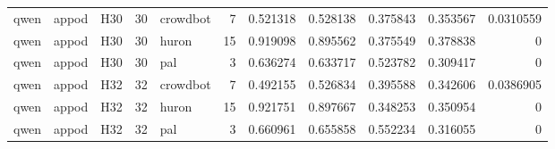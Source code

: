 \begin{longtable}{lllrlrrrrrr}
qwen & appod & H30 & 30 & crowdbot & 7 & 0.521318 & 0.528138 & 0.375843 & 0.353567 & 0.0310559 \\
qwen & appod & H30 & 30 & huron & 15 & 0.919098 & 0.895562 & 0.375549 & 0.378838 & 0 \\
qwen & appod & H30 & 30 & pal & 3 & 0.636274 & 0.633717 & 0.523782 & 0.309417 & 0 \\
qwen & appod & H32 & 32 & crowdbot & 7 & 0.492155 & 0.526834 & 0.395588 & 0.342606 & 0.0386905 \\
qwen & appod & H32 & 32 & huron & 15 & 0.921751 & 0.897667 & 0.348253 & 0.350954 & 0 \\
qwen & appod & H32 & 32 & pal & 3 & 0.660961 & 0.655858 & 0.552234 & 0.316055 & 0 \\
\end{longtable}
